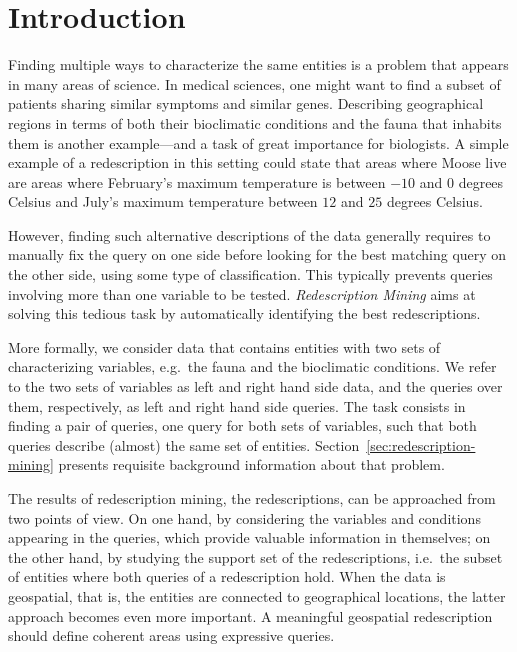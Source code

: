 \documentclass{llncs}
\renewcommand{\note}[1]{{\color{red}{#1}\par}}
\newcommand{\Siren}{\textsc{Siren}}
\begin{document}
\section{Introduction}
Finding multiple ways to characterize the same entities is a problem
that appears in many areas of science.  In medical sciences, one might
want to find a subset of patients sharing similar symptoms and similar
genes. Describing geographical regions in terms of both their
bioclimatic conditions and the fauna that inhabits them is another
example---and a task of great importance for biologists.  A 
simple example of a redescription in this setting could state that areas
where Moose live are areas where February's maximum temperature is
between $-10$ and $0$ degrees Celsius and July's maximum temperature
between $12$ and $25$ degrees Celsius. 

However, finding such alternative descriptions of the data
generally requires to manually fix the query on one side before
looking for the best matching query on the other side, using some type
of classification. This typically prevents queries involving more than
one variable to be tested. \emph{Redescription Mining} aims at
solving this tedious task by automatically identifying the best
redescriptions.

More formally, we consider data that contains entities with two sets
of characterizing variables, e.g.\ the fauna and the bioclimatic
conditions. We refer to the two sets of variables as left and right
hand side data, and the queries over them, respectively, as left and
right hand side queries.  The task consists in finding a pair of
queries, one query for both sets of variables, such that both queries
describe (almost) the same set of entities.
Section~\ref{sec:redescription-mining} presents requisite
background information about that problem.

The results of redescription mining, the redescriptions, can be
approached from two points of view. On one hand, by considering the
variables and conditions appearing in the queries, which provide
valuable information in themselves; on the other hand, by studying the
support set of the redescriptions, i.e.\ the subset of entities where
both queries of a redescription hold. When the data is geospatial,
that is, the entities are connected to geographical locations, the
latter approach becomes even more important. A meaningful geospatial
redescription should define coherent areas using expressive
queries. 
\end{document}
